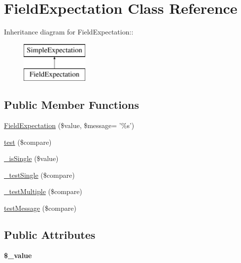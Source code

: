 \hypertarget{class_field_expectation}{
\section{FieldExpectation Class Reference}
\label{class_field_expectation}
}
Inheritance diagram for FieldExpectation::\begin{figure}[H]
\begin{center}
\leavevmode
\includegraphics[height=2cm]{class_field_expectation}
\end{center}
\end{figure}
\subsection*{Public Member Functions}
\begin{DoxyCompactItemize}
\item 
\hyperlink{class_field_expectation_a4b7f7a62437287d18eb9eb6910694761}{FieldExpectation} (\$value, \$message= '\%s')
\item 
\hyperlink{class_field_expectation_a2c4a77d26920b75241f177d94e7b220e}{test} (\$compare)
\item 
\hyperlink{class_field_expectation_a634084e075491c4c6dffa60beb8c0659}{\_\-isSingle} (\$value)
\item 
\hyperlink{class_field_expectation_a4eef89d4a9de8a41a0981b3918523f5d}{\_\-testSingle} (\$compare)
\item 
\hyperlink{class_field_expectation_aefd7811a38a60fe675c445841cffdd8a}{\_\-testMultiple} (\$compare)
\item 
\hyperlink{class_field_expectation_a98958cce79aa0e8f98da5c8bb53c21fa}{testMessage} (\$compare)
\end{DoxyCompactItemize}
\subsection*{Public Attributes}
\begin{DoxyCompactItemize}
\item 
\hypertarget{class_field_expectation_a661384bc2b758f126df8ef87dcacd857}{
{\bfseries \$\_\-value}}
\label{class_field_expectation_a661384bc2b758f126df8ef87dcacd857}

\end{DoxyCompactItemize}


